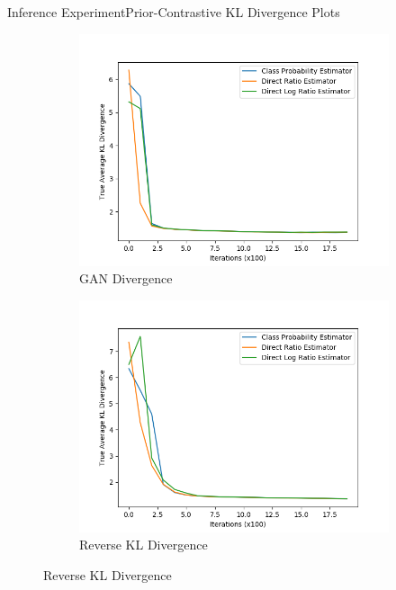 \documentclass{beamer}
\begin{document}
\begin{frame}{Inference Experiment}{Prior-Contrastive KL Divergence Plots}
\begin{figure}
\begin{subfigure}{0.49\textwidth}
\includegraphics[width=\linewidth]{part2truklmins/PCADVvsPCADVexpvsPCADVgudlog.png}
\caption{GAN Divergence}
\end{subfigure}
\begin{subfigure}{0.49\textwidth}
\includegraphics[width=\linewidth]{part2truklmins/PCKLDvsPCKLexpvsPCKLgudlog.png}
\caption{Reverse KL Divergence}
\end{subfigure}
\end{figure}
\end{frame}
\end{document}
